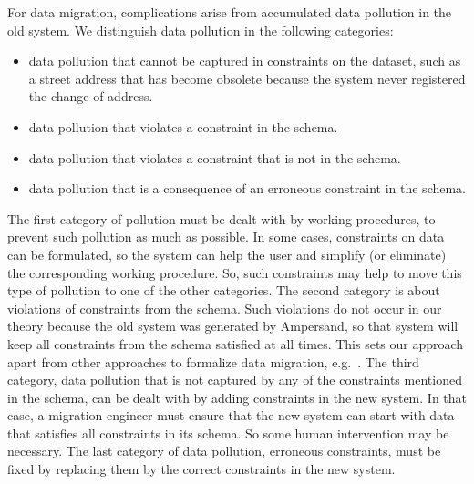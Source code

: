 \documentclass{elsarticle}
\begin{document}
   For data migration, complications arise from accumulated data pollution in the old system.
   We distinguish data pollution in the following categories:
\begin{itemize}
   \item data pollution that cannot be captured in constraints on the dataset,
   such as a street address that has become obsolete because the system never registered the change of address.
   \item data pollution that violates a constraint in the schema.
   \item data pollution that violates a constraint that is not in the schema.
   \item data pollution that is a consequence of an erroneous constraint in the schema.
\end{itemize}
   The first category of pollution must be dealt with by working procedures, to prevent such pollution as much as possible.
   In some cases, constraints on data can be formulated,
   so the system can help the user and simplify (or eliminate) the corresponding working procedure.
   So, such constraints may help to move this type of pollution to one of the other categories.
   The second category is about violations of constraints from the schema.
   Such violations do not occur in our theory because the old system was generated by Ampersand,
   so that system will keep all constraints from the schema satisfied at all times.
   This sets our approach apart from other approaches to formalize data migration, e.g.~\cite{Thalheim2013}.
   The third category, data pollution that is not captured by any of the constraints mentioned in the schema,
   can be dealt with by adding constraints in the new system.
   In that case, a migration engineer must ensure that the new system can start with data that satisfies all constraints in its schema.
   So some human intervention may be necessary.
   The last category of data pollution, erroneous constraints, must be fixed by replacing them by the correct constraints in the new system.
\end{document}
